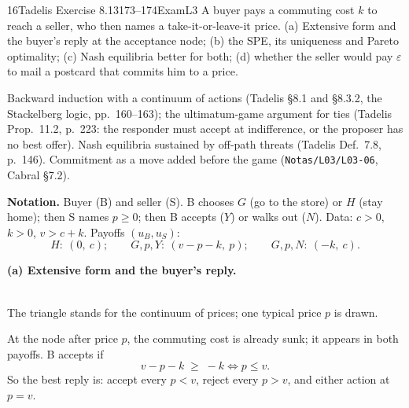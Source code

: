 \begin{exsol}{16}{Tadelis Exercise 8.13}{173--174}{Exam}{L3}
\asked A buyer pays a commuting cost $k$ to reach a seller, who then names a take-it-or-leave-it
price. (a) Extensive form and the buyer's reply at the acceptance node; (b) the SPE, its
uniqueness and Pareto optimality; (c) Nash equilibria better for both; (d) whether the seller
would pay $\varepsilon$ to mail a postcard that commits him to a price.

\method Backward induction with a continuum of actions (Tadelis \S8.1 and \S8.3.2, the
Stackelberg logic, pp.~160--163); the ultimatum-game argument for ties (Tadelis Prop.~11.2,
p.~223: the responder must accept at indifference, or the proposer has no best offer). Nash
equilibria sustained by off-path threats (Tadelis Def.~7.8, p.~146). Commitment as a move added
before the game (\texttt{Notas/L03/L03-06}, Cabral \S7.2).

\solution
\textbf{Notation.} Buyer (B) and seller (S). B chooses $G$ (go to the store) or $H$ (stay
home); then S names $p \ge 0$; then B accepts ($Y$) or walks out ($N$). Data: $c > 0$,
$k > 0$, $v > c + k$. Payoffs $(u_B, u_S)$:
\[
  H:\ (0,\ c);\qquad G,p,Y:\ (v - p - k,\ p);\qquad G,p,N:\ (-k,\ c).
\]

\textbf{(a) Extensive form and the buyer's reply.}
\begin{center}
\\[2pt]
{\footnotesize The triangle stands for the continuum of prices; one typical price $p$ is drawn.}
\end{center}
At the node after price $p$, the commuting cost is already sunk; it appears in both payoffs. B
accepts if
\[
  v - p - k \;\ge\; -k \iff p \le v .
\]
So the best reply is: accept every $p < v$, reject every $p > v$, and either action at $p = v$.


\end{exsol}
